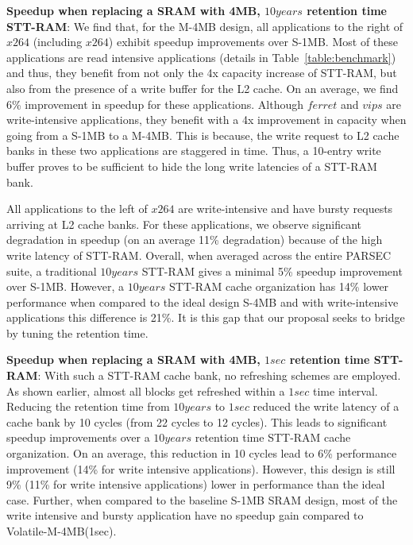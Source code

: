 {\bf Speedup when replacing a SRAM with 4MB, $10years$ retention time STT-RAM}: We find that, for the M-4MB design, all applications to the right of $x264$ (including $x264$) exhibit speedup improvements over S-1MB. Most of these applications are read intensive applications (details in Table~\ref{table:benchmark}) and thus, they benefit from not only the 4x capacity increase of STT-RAM, but also from the presence of a write buffer for the L2 cache. On an average, we find 6\% improvement in speedup for these applications. Although $ferret$ and $vips$ are write-intensive applications, they benefit with a 4x improvement in capacity when going from a S-1MB to a M-4MB. This is because, the write request to L2 cache banks in these two applications are staggered in time. Thus, a 10-entry write buffer proves to be sufficient to hide the long write latencies of a STT-RAM bank.

All applications to the left of $x264$ are write-intensive and have bursty requests arriving at L2 cache banks. For these applications, we observe significant degradation in speedup (on an average 11\% degradation) because of the high write latency of STT-RAM.
Overall, when averaged across the entire PARSEC suite, a traditional $10years$ STT-RAM gives a minimal 5\% speedup improvement over S-1MB. However, a $10years$ STT-RAM cache organization has 14\% lower performance when compared to the ideal design S-4MB and with write-intensive applications this difference is 21\%. It is this gap that our proposal seeks to bridge by tuning the retention time.

{\bf Speedup when replacing a SRAM with 4MB, $1sec$ retention time STT-RAM}: With such a STT-RAM cache bank, no refreshing schemes are employed. As shown earlier, almost all blocks get refreshed within a $1sec$ time interval. Reducing the retention time from $10years$ to $1sec$ reduced the write latency of a cache bank by 10 cycles (from 22 cycles to 12 cycles). This leads to significant speedup improvements over a $10years$ retention time STT-RAM cache organization. On an average, this reduction in 10 cycles lead to 6\% performance improvement (14\% for write intensive applications). However, this design is still 9\% (11\% for write intensive applications) lower in performance than the ideal case.
Further, when compared to the baseline S-1MB SRAM design, most of the write intensive and bursty application have no speedup gain compared to
Volatile-M-4MB(1sec).

